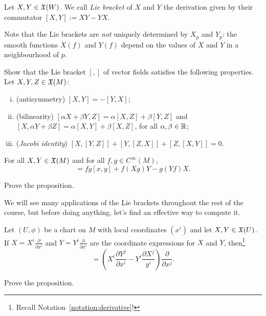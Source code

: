 \begin{definition}
    Let $X,Y\in\mathfrak{X}(W)$. We call \emph{Lie bracket} of $X$ and $Y$ the derivation given by their commutator $[X,Y] := X Y - Y X$.
\end{definition}

\begin{remark}
  Note that the Lie brackets are \emph{not} uniquely determined by $X_p$ and $Y_p$: the smooth functions $X(f)$ and $Y(f)$ depend on the values of $X$ and $Y$ in a neighbourhood of $p$.
\end{remark}

\begin{exercise}\label{ex:vfliealgebra}
  Show that the Lie bracket $[,]$ of vector fields satisfies the following properties. Let $X,Y,Z\in\mathfrak{X}(M)$:
  \begin{enumerate}[(i)]
    \item (antisymmetry) $[X, Y] = - [Y, X]$;
    \item (bilinearity) $[\alpha X + \beta Y, Z] = \alpha [X, Z] + \beta [Y, Z]$ and $[X, \alpha Y + \beta Z] = \alpha [X, Y] + \beta [X, Z]$, for all $\alpha,\beta \in\mathbb{R}$;
    \item (\emph{Jacobi identity}) $[X,[Y,Z]] + [Y,[Z,X]] + [Z,[X,Y]] = 0$.
  \end{enumerate}
\end{exercise}

\begin{proposition}
  For all $X, Y \in \mathfrak{X}(M)$ and for all $f,g\in C^\infty(M)$,
  \begin{equation}
    [fX, gY] = fg[x,y] + f(Xg)Y - g(Yf)X.
  \end{equation}
\end{proposition}
\begin{exercise}
  Prove the proposition.
\end{exercise}

We will see many applications of the Lie brackets throughout the rest of the course, but before doing anything, let's find an effective way to compute it.

\begin{proposition}
    Let $(U, \phi)$ be a chart on $M$ with local coordinates $(x^i)$ and let $X,Y\in\mathfrak{X}(U)$.
    If $X = X^i \frac{\partial }{\partial x^i}$ and $Y = Y^i \frac{\partial}{\partial x^i}$ are the coordinate expressions for $X$ and $Y$, then\footnote{Recall Notation~\ref{notation:derivative}!}
    \begin{equation}
        [X,Y] = \left(X^i\frac{\partial Y^j}{\partial x^i} - Y^i\frac{\partial X^j}{y^i}\right)\frac{\partial}{\partial x^j}.
    \end{equation}
\end{proposition}
\begin{exercise}
  Prove the proposition.
\end{exercise}

